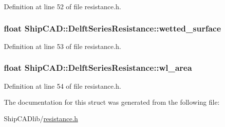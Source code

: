 Definition at line 52 of file resistance.\-h.

\hypertarget{structShipCAD_1_1DelftSeriesResistance_a7ee0a7e2d05634beb7fb9951d80c7557}{
\subsubsection[{wetted\-\_\-surface}]{\setlength{\rightskip}{0pt plus 5cm}float Ship\-C\-A\-D\-::\-Delft\-Series\-Resistance\-::wetted\-\_\-surface}}\label{structShipCAD_1_1DelftSeriesResistance_a7ee0a7e2d05634beb7fb9951d80c7557}


Definition at line 53 of file resistance.\-h.

\hypertarget{structShipCAD_1_1DelftSeriesResistance_af51e72b70af1ce87cf7ac641df93c541}{
\subsubsection[{wl\-\_\-area}]{\setlength{\rightskip}{0pt plus 5cm}float Ship\-C\-A\-D\-::\-Delft\-Series\-Resistance\-::wl\-\_\-area}}\label{structShipCAD_1_1DelftSeriesResistance_af51e72b70af1ce87cf7ac641df93c541}


Definition at line 54 of file resistance.\-h.



The documentation for this struct was generated from the following file\-:\begin{DoxyCompactItemize}
\item 
Ship\-C\-A\-Dlib/\hyperlink{resistance_8h}{resistance.\-h}\end{DoxyCompactItemize}

